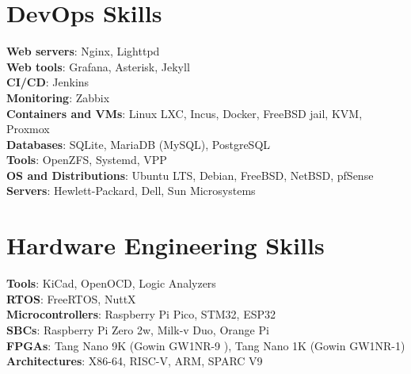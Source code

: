 \documentclass[a4paper,11pt]{article}
\begin{document}
\section{DevOps Skills}
\begin{itemize}[leftmargin=0.15in, label={}]
    \normalsize{\item{
                    \textbf{Web servers}{: Nginx, Lighttpd} \\
                    \textbf{Web tools}{: Grafana, Asterisk, Jekyll} \\
                    \textbf{CI/CD}{: Jenkins} \\
                    \textbf{Monitoring}{: Zabbix} \\
                    \textbf{Containers and VMs}{: Linux LXC, Incus, Docker, FreeBSD jail, KVM, Proxmox} \\
                    \textbf{Databases}{: SQLite, MariaDB (MySQL), PostgreSQL} \\
                    \textbf{Tools}{: OpenZFS, Systemd, VPP} \\
                    \textbf{OS and Distributions}{: Ubuntu LTS, Debian, FreeBSD, NetBSD, pfSense} \\
                    \textbf{Servers}{: Hewlett-Packard, Dell, Sun Microsystems} \\
              }}
\end{itemize}

\section{Hardware Engineering Skills}
\begin{itemize}[leftmargin=0.15in, label={}]
    \normalsize{\item{
                    \textbf{Tools}{: KiCad, OpenOCD, Logic Analyzers} \\
                    \textbf{RTOS}{: FreeRTOS, NuttX} \\
                    \textbf{Microcontrollers}{: Raspberry Pi Pico, STM32, ESP32} \\
                    \textbf{SBCs}{: Raspberry Pi Zero 2w, Milk-v Duo, Orange Pi} \\
                    \textbf{FPGAs}{: Tang Nano 9K (Gowin GW1NR-9 ), Tang Nano 1K (Gowin GW1NR-1)} \\
                    \textbf{Architectures}{: X86-64, RISC-V, ARM, SPARC V9} \\
              }}
\end{itemize}
\end{document}
